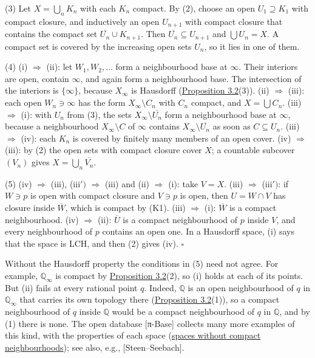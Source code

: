 \documentclass[
  english,
  11pt,
  a4paper,
]{article}
\newcounter{none} %
\begin{document}
(3) Let \(X=\bigcup_nK_n\) with each \(K_n\) compact. By (2), choose an
open \(U_1\supseteq K_1\) with compact closure, and inductively an open
\(U_{n+1}\) with compact closure that contains the compact set
\(\overline{U_n}\cup K_{n+1}\). Then \(\overline{U_n}\subseteq U_{n+1}\)
and \(\bigcup U_n=X\). A compact set is covered by the increasing open
sets \(U_n\), so it lies in one of them.

(4) (i) \(\Rightarrow\) (ii): let \(W_1,W_2,\ldots\) form a
neighbourhood base at \(\infty\). Their interiors are open, contain
\(\infty\), and again form a neighbourhood base. The intersection of the
interiors is \(\{\infty\}\), because \(X_\infty\) is Hausdorff
(\hyperlink{the-stone-weierstrass-theorem-for-functions-vanishing-at-infinity--oa-fnd-sw-02}{Proposition
3.2}(3)). (ii) \(\Rightarrow\) (iii): each open \(W_n\ni\infty\) has the
form \(X_\infty\setminus C_n\) with \(C_n\) compact, and
\(X=\bigcup C_n\). (iii) \(\Rightarrow\) (i): with \(U_n\) from (3), the
sets \(X_\infty\setminus\overline{U_n}\) form a neighbourhood base at
\(\infty\), because a neighbourhood \(X_\infty\setminus C\) of
\(\infty\) contains \(X_\infty\setminus\overline{U_n}\) as soon as
\(C\subseteq U_n\). (iii) \(\Rightarrow\) (iv): each \(K_n\) is covered
by finitely many members of an open cover. (iv) \(\Rightarrow\) (iii):
by (2) the open sets with compact closure cover \(X\); a countable
subcover \((V_n)\) gives \(X=\bigcup_n\overline{V_n}\).

(5) (iv) \(\Rightarrow\) (iii), (iii\(')\) \(\Rightarrow\) (iii) and
(ii) \(\Rightarrow\) (i): take \(V=X\). (iii) \(\Rightarrow\)
(iii\(')\): if \(W\ni p\) is open with compact closure and \(V\ni p\) is
open, then \(U=W\cap V\) has closure inside \(\overline W\), which is
compact by (K1). (iii) \(\Rightarrow\) (i): \(\overline W\) is a compact
neighbourhood. (iv) \(\Rightarrow\) (ii): \(\overline U\) is a compact
neighbourhood of \(p\) inside \(V\), and every neighbourhood of \(p\)
contains an open one. In a Hausdorff space, (i) says that the space is
LCH, and then (2) gives (iv). \(\square\)

Without the Hausdorff property the conditions in (5) need not agree. For
example, \(\mathbb Q_\infty\) is compact by
\hyperlink{the-stone-weierstrass-theorem-for-functions-vanishing-at-infinity--oa-fnd-sw-02}{Proposition
3.2}(2), so (i) holds at each of its points. But (ii) fails at every
rational point \(q\). Indeed, \(\mathbb Q\) is an open neighbourhood of
\(q\) in \(\mathbb Q_\infty\) that carries its own topology there
(\hyperlink{the-stone-weierstrass-theorem-for-functions-vanishing-at-infinity--oa-fnd-sw-02}{Proposition
3.2}(1)), so a compact neighbourhood of \(q\) inside \(\mathbb Q\) would
be a compact neighbourhood of \(q\) in \(\mathbb Q\), and by (1) there
is none. The open database {[}π-Base{]} collects many more examples of
this kind, with the properties of each space
(\href{https://topology.pi-base.org/properties/P000023}{spaces without
compact neighbourhoods}); see also, e.g., {[}Steen--Seebach{]}.
\end{document}
